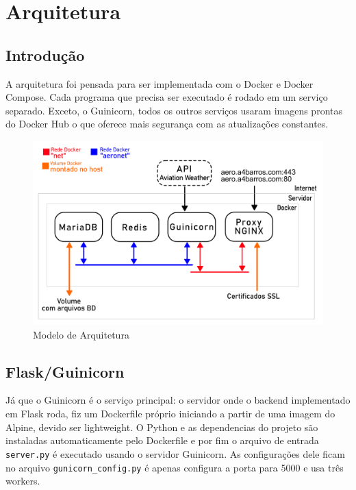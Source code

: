 \chapter{Arquitetura}

\section{Introdução}
A arquitetura foi pensada para ser implementada com o Docker e Docker Compose. Cada
programa que precisa ser executado é rodado em um serviço separado. Exceto, o Guinicorn,
todos os outros serviços usaram imagens prontas do Docker Hub o que oferece mais segurança
com as atualizações constantes.

\begin{figure}[ht]
    \begin{center}
    \includegraphics[width=\linewidth]{img/diagrama-arquitetura.png}
    \caption{Modelo de Arquitetura}
    \label{fig:arquitetura}
    \end{center}
\end{figure}

\section{Flask/Guinicorn}

Já que o Guinicorn é o serviço principal: o servidor onde o backend implementado em Flask roda,
fiz um Dockerfile próprio iniciando a partir de uma imagem do Alpine, devido ser lightweight.
O Python e as dependencias do projeto são instaladas automaticamente pelo Dockerfile e por
fim o arquivo de entrada \texttt{server.py} é executado usando o servidor Guinicorn. As configurações
dele ficam no arquivo \texttt{gunicorn\_config.py} é apenas configura a porta para 5000 e usa três workers.

